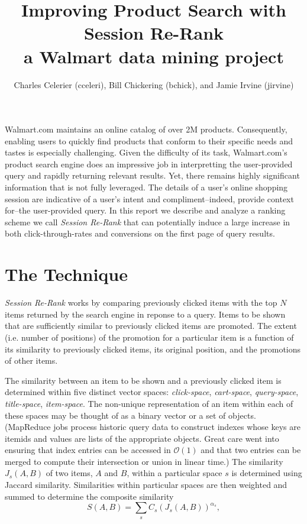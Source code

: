 \documentclass{article}
\title{Improving Product Search with Session Re-Rank\\
    \large{a Walmart data mining project}}
\author{Charles Celerier (cceleri), Bill Chickering (bchick),
        and Jamie Irvine (jirvine)}
\begin{document}
\maketitle

Walmart.com maintains an online catalog of over 2M products. Consequently,
enabling users to quickly find products that conform to their specific needs and
tastes is especially challenging. Given the difficulty of its task,
Walmart.com's product search engine does an impressive job in interpretting the
user-provided query and rapidly returning relevant results. Yet, there remains
highly significant information that is not fully leveraged. The details of a
user's online shopping session are indicative of a user's intent and
compliment--indeed, provide context for--the user-provided query. In this report
we describe and analyze a ranking scheme we call {\em Session Re-Rank} that can
potentially induce a large increase in both click-through-rates and conversions
on the first page of query results.

\section{The Technique}

{\em Session Re-Rank} works by comparing previously clicked items with the top
$N$ items returned by the search engine in reponse to a query. Items to be shown
that are sufficiently similar to previously clicked items are promoted. The
extent (i.e. number of positions) of the promotion for a particular item is a
function of its similarity to previously clicked items, its original position,
and the promotions of other items.

The similarity between an item to be shown and a previously clicked item is
determined within five distinct vector spaces: {\em click-space}, {\em
cart-space}, {\em query-space}, {\em title-space}, {\em item-space}. The
non-unique representation of an item within each of these spaces may be thought
of as a binary vector or a set of objects. (MapReduce jobs process historic
query data to construct indexes whose keys are itemids and values are lists of
the appropriate objects. Great care went into ensuring that index entries can be
accessed in $\mathcal{O}(1)$ and that two entries can be merged to compute their
intersection or union in linear time.) The similarity $J_s(A, B)$ of two items,
$A$ and $B$, within a particular space $s$ is determined using Jaccard
similarity. Similarities within particular spaces are then weighted and summed
to determine the composite similarity
\begin{equation*}
    S(A, B) = \sum_s{C_s(J_s(A, B))^{\alpha_s}},
\end{equation*}
\end{document}
